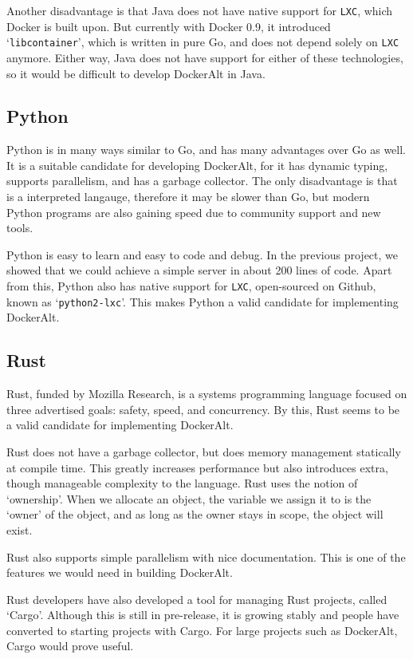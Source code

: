 \documentclass[letterpaper,twocolumn,10pt]{article}
\begin{document}
Another disadvantage is that Java does not have native support for {\tt LXC}, which Docker is built upon. But currently with Docker 0.9, it introduced `{\tt libcontainer}', which is written in pure Go, and does not depend solely on {\tt LXC} anymore. Either way, Java does not have support for either of these technologies, so it would be difficult to develop DockerAlt in Java.

\subsection{Python}

Python is in many ways similar to Go, and has many advantages over Go as well. It is a suitable candidate for developing DockerAlt, for it has dynamic typing, supports parallelism, and has a garbage collector. The only disadvantage is that is a interpreted langauge, therefore it may be slower than Go, but modern Python programs are also gaining speed due to community support and new tools.

Python is easy to learn and easy to code and debug. In the previous project, we showed that we could achieve a simple server in about 200 lines of code. Apart from this, Python also has native support for {\tt LXC}, open-sourced on Github, known as `{\tt python2-lxc}'. This makes Python a valid candidate for implementing DockerAlt.

\subsection{Rust}

Rust, funded by Mozilla Research, is a systems programming language focused on three advertised goals: safety, speed, and concurrency. By this, Rust seems to be a valid candidate for implementing DockerAlt.

Rust does not have a garbage collector, but does memory management statically at compile time. This greatly increases performance but also introduces extra, though manageable complexity to the language. Rust uses the notion of `ownership'. When we allocate an object, the variable we assign it to is the `owner' of the object, and as long as the owner stays in scope, the object will exist.

Rust also supports simple parallelism with nice documentation. This is one of the features we would need in building DockerAlt.

Rust developers have also developed a tool for managing Rust projects, called `Cargo'. Although this is still in pre-release, it is growing stably and people have converted to starting projects with Cargo. For large projects such as DockerAlt, Cargo would prove useful.
\end{document}
